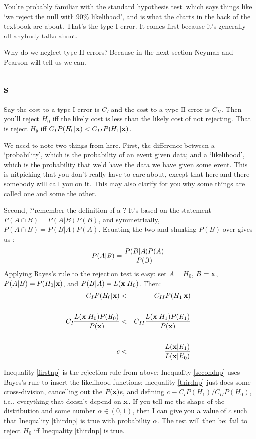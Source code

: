 You're probably familiar with the
standard hypothesis test, which says things like `we reject the null with 90\%
likelihood', and is what the charts in the back of the textbook are about.
That's the type I error. It comes first because
it's generally all anybody talks about.


Why do we neglect type II errors? Because in the next section Neyman and Pearson will tell us we can.

\subsection{s}

Say the cost to a type I error is $C_I$ and the cost to a type II error is $C_{II}$.
Then you'll reject $H_0$ iff the likely cost is less than the likely cost of not
rejecting. That is reject $H_0$ iff $C_I P(H_0|{\bf x})<C_{II} P(H_1|{\bf x})$.

We need to note two things from here. First, the difference between a `probability',
which is the probability of an event given data; and a `likelihood', which is the
probability that we'd have the data we have given some event. This is nitpicking that
you don't really have to care about, except that here and there somebody will call you
on it. This may also clarify for you why some things are called one and some the
other.

Second, ?`remember the definition of a ? It's based on the
statement $P(A\cap B)=P(A|B)P(B)$, and symmetrically, $P(A\cap B)=P(B|A)P(A)$.  Equating
the two and shunting $P(B)$ over gives us : $$P(A|B)={P(B|A) P(A)\over P(B)}$$
Applying Bayes's rule to the rejection test is easy: set $A=H_0$, $B={\bf x}$,
$P(A|B)=P(H_0|{\bf x})$, and $P(B|A)=L({\bf x}|H_0)$. Then:
\begin{eqnarray}
C_I P(H_0|{\bf x})&<&C_{II} P(H_1|{\bf x})\label{firstnp}\\
\nonumber\\
C_I {L({\bf x}|H_0)P(H_0)\over P({\bf x})}&<& C_{II} {L({\bf x}|H_1)P(H_1)\over P({\bf x})}\label{secondnp}\\
\nonumber\\
c&<& {L({\bf x}|H_1)\over L({\bf x}|H_0)}\label{thirdnp}
\end{eqnarray}

Inequality \ref{firstnp} is the rejection rule from above; Inequality
\ref{secondnp} uses Bayes's rule to insert the likelihood functions;
Inequality \ref{thirdnp} just does some cross-division, cancelling out the
$P({\bf x})$s, and defining $c\equiv C_IP(H_1)/C_{II}P(H_0)$, i.e., everything
that doesn't depend on ${\bf x}$. If you tell me the shape of the distribution
and some number $\alpha\in(0,1)$, then I can give you a value of $c$
such that Inequality \ref{thirdnp} is true with probability
$\alpha$. The test will then be: fail to reject $H_0$ iff Inequality
\ref{thirdnp} is true.

